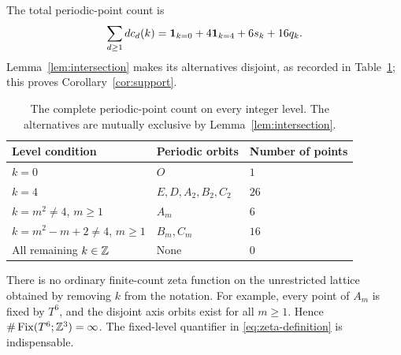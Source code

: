 The total periodic-point count is
\begin{equation}\label{eq:total}
 \sum_{d\geq1}dc_d(k)=
 \mathbf 1_{k=0}+4\mathbf 1_{k=4}+6s_k+16q_k.
\end{equation}
Lemma~\ref{lem:intersection} makes its alternatives disjoint, as
recorded in Table~\ref{tab:levels}; this proves
Corollary~\ref{cor:support}.

\begin{table}[htbp]
\centering
\begin{tabular}{@{}lll@{}}
\toprule
Level condition & Periodic orbits & Number of points\\
\midrule
$k=0$ & $O$ & $1$\\
$k=4$ & $E,D,A_2,B_2,C_2$ & $26$\\
$k=m^2\ne4$, $m\geq1$ & $A_m$ & $6$\\
$k=m^2-m+2\ne4$, $m\geq1$ & $B_m,C_m$ & $16$\\
All remaining $k\in\mathbb Z$ & None & $0$\\
\bottomrule
\end{tabular}
\caption{The complete periodic-point count on every integer level.
The alternatives are mutually exclusive by Lemma~\ref{lem:intersection}.}
\label{tab:levels}
\end{table}

There is no ordinary finite-count zeta function on the unrestricted
lattice obtained by removing $k$ from the notation. For example,
every point of $A_m$ is fixed by $T^6$, and the disjoint axis
orbits exist for all $m\geq1$. Hence
$\#\operatorname{Fix}(T^6;\mathbb Z^3)=\infty$. The fixed-level quantifier in
\eqref{eq:zeta-definition} is indispensable.
